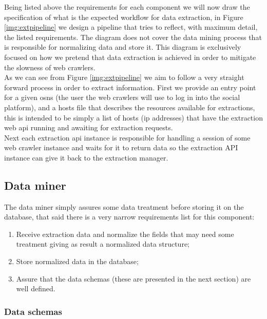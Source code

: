Being listed above the requirements for each component we will now draw the specification of what is the expected workflow for data extraction, in Figure \ref{img:extpipeline} we design a pipeline that tries to reflect, with maximum detail, the listed requirements. The diagram does not cover the data mining process that is responsible for normalizing data and store it. This diagram is exclusively focused on how we pretend that data extraction is achieved in order to mitigate the slowness of web crawlers.\\
\indent As we can see from Figure \ref{img:extpipeline} we aim to follow a very straight forward process in order to extract information. First we provide an entry point for a given \glspl{osn} (the user the web crawlers will use to log in into the social platform), and a hosts file that describes the resources available for extractions, this is intended to be simply a list of hosts (ip addresses) that have the extraction web \gls{api} running and awaiting for extraction requests.\\
\indent Next each extraction \gls{api} instance is responsible for handling a session of some web crawler instance and waits for it to return data so the extraction API instance  can give it back to the extraction manager.

\clearpage

\subsection{Data miner}
\label{sec:dataminer}

The data miner simply assures some data treatment before storing it on the database, that said there is a very narrow requirements list for this component:

\begin{enumerate}
\item Receive extraction data and normalize the fields that may need some treatment giving as result a normalized data structure;
\item Store normalized data in the database;
\item Assure that the data schemas (these are presented in the next section) are well defined.
\end{enumerate}

\subsubsection{Data schemas}

